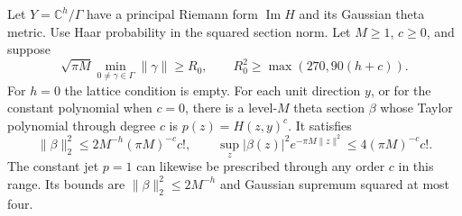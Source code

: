 \begin{auxlemma}
\label{lem:light-thick-interpolation}
Let \(Y=\mathbb C^h/\Gamma\) have a principal Riemann form
\(\operatorname{Im}H\) and its Gaussian theta metric. Use Haar
probability in the squared section norm. Let \(M\ge1\), \(c\ge0\),
and suppose
\[
 \sqrt{\pi M}\min_{0\ne\gamma\in\Gamma}\|\gamma\|\ge R_0,\qquad
 R_0^2\ge\max(270,90(h+c)).
\]
For \(h=0\) the lattice condition is empty. For each unit direction
\(y\), or for the constant polynomial when \(c=0\), there is a
level-\(M\) theta section \(\beta\) whose Taylor polynomial through
degree \(c\) is \(p(z)=H(z,y)^c\). It satisfies
\[
 \|\beta\|_2^2\le2M^{-h}(\pi M)^{-c}c!,\qquad
 \sup_z |\beta(z)|^2e^{-\pi M\|z\|^2}\le4(\pi M)^{-c}c!.
\]
The constant jet \(p=1\) can likewise be prescribed through any
order \(c\) in this range. Its bounds are
\(\|\beta\|_2^2\le2M^{-h}\) and Gaussian supremum squared at most four.
\end{auxlemma}
